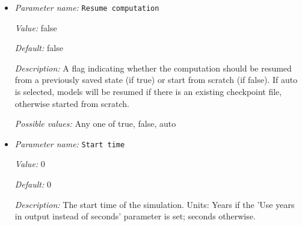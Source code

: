 \begin{itemize}
{\it Value:} volume


{\it Default:} surface


{\it Description:} If and how to normalize the pressure after the solution step. This is necessary because depending on boundary conditions, in many cases the pressure is only determined by the model up to a constant. On the other hand, we often would like to have a well-determined pressure, for example for table lookups of material properties in models or for comparing solutions. If the given value is `surface', then normalization at the end of each time steps adds a constant value to the pressure in such a way that the average pressure at the surface of the domain is what is set in the `Surface pressure' parameter; the surface of the domain is determined by asking the geometry model whether a particular face of the geometry has a zero or small `depth'. If the value of this parameter is `volume' then the pressure is normalized so that the domain average is zero. If `no' is given, the no pressure normalization is performed.


{\it Possible values:} Any one of surface, volume, no
\item {\it Parameter name:} {\tt Resume computation}
\label{parameters:Resume computation}
\label{parameters:Resume_20computation}


{\it Value:} false


{\it Default:} false


{\it Description:} A flag indicating whether the computation should be resumed from a previously saved state (if true) or start from scratch (if false). If auto is selected, models will be resumed if there is an existing checkpoint file, otherwise started from scratch.


{\it Possible values:} Any one of true, false, auto
\item {\it Parameter name:} {\tt Start time}
\label{parameters:Start time}
\label{parameters:Start_20time}


{\it Value:} 0


{\it Default:} 0


{\it Description:} The start time of the simulation. Units: Years if the 'Use years in output instead of seconds' parameter is set; seconds otherwise.



\end{itemize}
